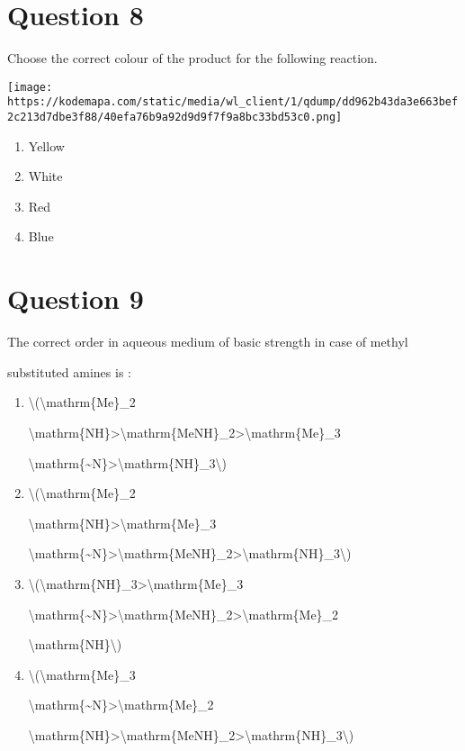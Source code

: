 \documentclass{article}
\begin{document}
\section*{Question 8}
Choose the correct colour of the product for the following reaction.



\texttt{[image: https://kodemapa.com/static/media/wl\_client/1/qdump/dd962b43da3e663bef2c213d7dbe3f88/40efa76b9a92d9d9f7f9a8bc33bd53c0.png]}\\


\begin{enumerate}[label=(\alph*)]
\item Yellow


\item White


\item Red


\item Blue


\end{enumerate}
\newpage
\section*{Question 9}
The correct order in aqueous medium of basic strength in case of methyl

substituted amines is :


\begin{enumerate}[label=(\alph*)]
\item \textbackslash(\textbackslash mathrm\{Me\}\_2

\textbackslash mathrm\{NH\}\textgreater\textbackslash mathrm\{MeNH\}\_2\textgreater\textbackslash mathrm\{Me\}\_3

\textbackslash mathrm\{\textasciitilde N\}\textgreater\textbackslash mathrm\{NH\}\_3\textbackslash)


\item \textbackslash(\textbackslash mathrm\{Me\}\_2

\textbackslash mathrm\{NH\}\textgreater\textbackslash mathrm\{Me\}\_3

\textbackslash mathrm\{\textasciitilde N\}\textgreater\textbackslash mathrm\{MeNH\}\_2\textgreater\textbackslash mathrm\{NH\}\_3\textbackslash)


\item \textbackslash(\textbackslash mathrm\{NH\}\_3\textgreater\textbackslash mathrm\{Me\}\_3

\textbackslash mathrm\{\textasciitilde N\}\textgreater\textbackslash mathrm\{MeNH\}\_2\textgreater\textbackslash mathrm\{Me\}\_2

\textbackslash mathrm\{NH\}\textbackslash)


\item \textbackslash(\textbackslash mathrm\{Me\}\_3

\textbackslash mathrm\{\textasciitilde N\}\textgreater\textbackslash mathrm\{Me\}\_2

\textbackslash mathrm\{NH\}\textgreater\textbackslash mathrm\{MeNH\}\_2\textgreater\textbackslash mathrm\{NH\}\_3\textbackslash)


\end{enumerate}
\newpage
\end{document}
